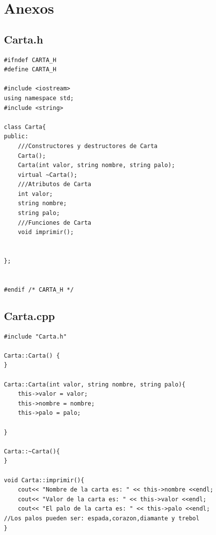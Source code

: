 \documentclass[11pt]{article}
\begin{document}
\section{Anexos}
\subsection{Carta.h}
\begin{lstlisting}
#ifndef CARTA_H
#define CARTA_H

#include <iostream>
using namespace std;
#include <string>

class Carta{
public:
    ///Constructores y destructores de Carta
	Carta();
	Carta(int valor, string nombre, string palo);
	virtual ~Carta();
    ///Atributos de Carta
	int valor;
	string nombre;
	string palo;
    ///Funciones de Carta
	void imprimir();

	
};


#endif /* CARTA_H */
\end{lstlisting}

\newpage
\subsection{Carta.cpp}
\begin{lstlisting}
#include "Carta.h"

Carta::Carta() {
}

Carta::Carta(int valor, string nombre, string palo){
	this->valor = valor;
	this->nombre = nombre;
	this->palo = palo;

}

Carta::~Carta(){
}

void Carta::imprimir(){
	cout<< "Nombre de la carta es: " << this->nombre <<endl;
	cout<< "Valor de la carta es: " << this->valor <<endl;
	cout<< "El palo de la carta es: " << this->palo <<endl;
//Los palos pueden ser: espada,corazon,diamante y trebol
}
\end{lstlisting}
\newpage
\end{document}
